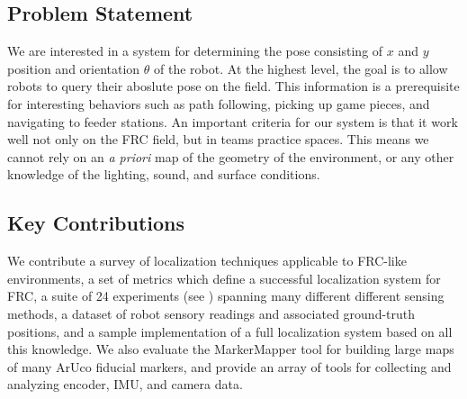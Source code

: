\documentclass{article}
\newcommand{\Newnameref}[1]{\textit{\nameref{#1}}}
\begin{document}
\subsection{Problem Statement}

  We are interested in a system for determining the pose consisting of $x$ and $y$ position and orientation $\theta$ of the robot. At the highest level, the goal is to allow robots to query their aboslute pose on the field. This information is a prerequisite for interesting behaviors such as path following, picking up game pieces, and navigating to feeder stations. An important criteria for our system is that it work well not only on the FRC field, but in teams practice spaces. This means we cannot rely on an \textit{a priori} map of the geometry of the environment, or any other knowledge of the lighting, sound, and surface conditions.





\subsection{Key Contributions}

  We contribute a survey of localization techniques applicable to FRC-like environments, a set of metrics which define a successful localization system for FRC, a suite of 24 experiments (see \Newnameref{section:experiments}) spanning many different different sensing methods, a dataset of robot sensory readings and associated ground-truth positions, and a sample implementation of a full localization system based on all this knowledge. We also evaluate the MarkerMapper tool for building large maps of many ArUco fiducial markers, and provide an array of tools for collecting and analyzing encoder, IMU, and camera data.
\end{document}
